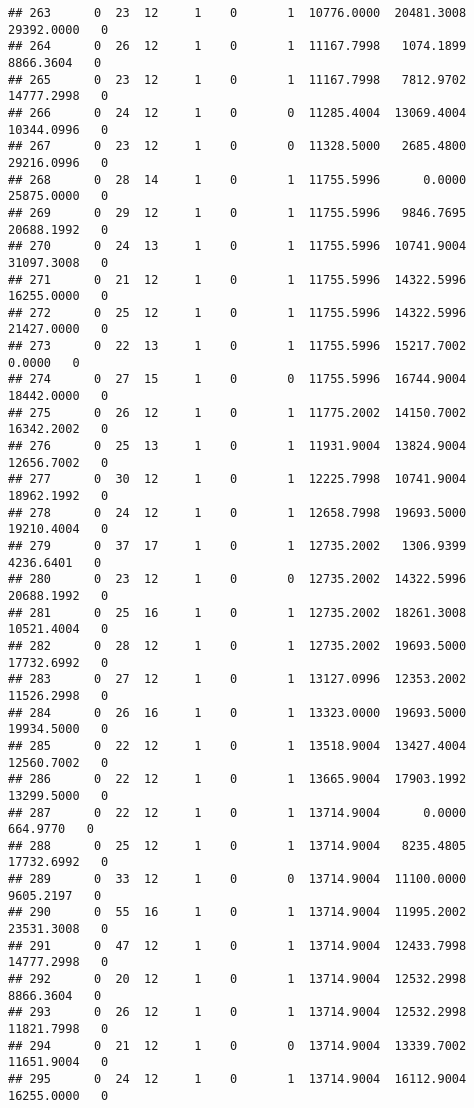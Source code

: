 \documentclass[
]{article}
\begin{document}
\begin{enumerate}
\begin{verbatim}
## 263      0  23  12     1    0       1  10776.0000  20481.3008  29392.0000   0
## 264      0  26  12     1    0       1  11167.7998   1074.1899   8866.3604   0
## 265      0  23  12     1    0       1  11167.7998   7812.9702  14777.2998   0
## 266      0  24  12     1    0       0  11285.4004  13069.4004  10344.0996   0
## 267      0  23  12     1    0       0  11328.5000   2685.4800  29216.0996   0
## 268      0  28  14     1    0       1  11755.5996      0.0000  25875.0000   0
## 269      0  29  12     1    0       1  11755.5996   9846.7695  20688.1992   0
## 270      0  24  13     1    0       1  11755.5996  10741.9004  31097.3008   0
## 271      0  21  12     1    0       1  11755.5996  14322.5996  16255.0000   0
## 272      0  25  12     1    0       1  11755.5996  14322.5996  21427.0000   0
## 273      0  22  13     1    0       1  11755.5996  15217.7002      0.0000   0
## 274      0  27  15     1    0       0  11755.5996  16744.9004  18442.0000   0
## 275      0  26  12     1    0       1  11775.2002  14150.7002  16342.2002   0
## 276      0  25  13     1    0       1  11931.9004  13824.9004  12656.7002   0
## 277      0  30  12     1    0       1  12225.7998  10741.9004  18962.1992   0
## 278      0  24  12     1    0       1  12658.7998  19693.5000  19210.4004   0
## 279      0  37  17     1    0       1  12735.2002   1306.9399   4236.6401   0
## 280      0  23  12     1    0       0  12735.2002  14322.5996  20688.1992   0
## 281      0  25  16     1    0       1  12735.2002  18261.3008  10521.4004   0
## 282      0  28  12     1    0       1  12735.2002  19693.5000  17732.6992   0
## 283      0  27  12     1    0       1  13127.0996  12353.2002  11526.2998   0
## 284      0  26  16     1    0       1  13323.0000  19693.5000  19934.5000   0
## 285      0  22  12     1    0       1  13518.9004  13427.4004  12560.7002   0
## 286      0  22  12     1    0       1  13665.9004  17903.1992  13299.5000   0
## 287      0  22  12     1    0       1  13714.9004      0.0000    664.9770   0
## 288      0  25  12     1    0       1  13714.9004   8235.4805  17732.6992   0
## 289      0  33  12     1    0       0  13714.9004  11100.0000   9605.2197   0
## 290      0  55  16     1    0       1  13714.9004  11995.2002  23531.3008   0
## 291      0  47  12     1    0       1  13714.9004  12433.7998  14777.2998   0
## 292      0  20  12     1    0       1  13714.9004  12532.2998   8866.3604   0
## 293      0  26  12     1    0       1  13714.9004  12532.2998  11821.7998   0
## 294      0  21  12     1    0       0  13714.9004  13339.7002  11651.9004   0
## 295      0  24  12     1    0       1  13714.9004  16112.9004  16255.0000   0

\end{verbatim}
\end{enumerate}
\end{document}
